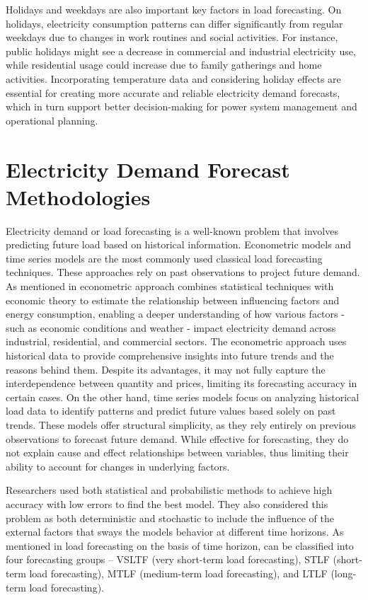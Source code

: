 \documentclass[mstat,12pt]{unswthesis}
\begin{document}
Holidays and weekdays are also important key factors in load
forecasting. On holidays, electricity consumption patterns can differ
significantly from regular weekdays due to changes in work routines and
social activities. For instance, public holidays might see a decrease in
commercial and industrial electricity use, while residential usage could
increase due to family gatherings and home activities. Incorporating
temperature data and considering holiday effects are essential for
creating more accurate and reliable electricity demand forecasts, which
in turn support better decision-making for power system management and
operational planning.

\bigskip

\section{Electricity Demand Forecast
Methodologies}\label{electricity-demand-forecast-methodologies}

Electricity demand or load forecasting is a well-known problem that
involves predicting future load based on historical information.
Econometric models and time series models are the most commonly used
classical load forecasting techniques. These approaches rely on past
observations to project future demand. As mentioned in \cite{9812604}
econometric approach combines statistical techniques with economic
theory to estimate the relationship between influencing factors and
energy consumption, enabling a deeper understanding of how various
factors - such as economic conditions and weather - impact electricity
demand across industrial, residential, and commercial sectors. The
econometric approach uses historical data to provide comprehensive
insights into future trends and the reasons behind them. Despite its
advantages, it may not fully capture the interdependence between
quantity and prices, limiting its forecasting accuracy in certain cases.
On the other hand, time series models focus on analyzing historical load
data to identify patterns and predict future values based solely on past
trends. These models offer structural simplicity, as they rely entirely
on previous observations to forecast future demand. While effective for
forecasting, they do not explain cause and effect relationships between
variables, thus limiting their ability to account for changes in
underlying factors.

\bigskip

Researchers used both statistical and probabilistic methods to achieve
high accuracy with low errors to find the best model. They also
considered this problem as both deterministic and stochastic to include
the influence of the external factors that sways the models behavior at
different time horizons. As mentioned in \cite{9812604} load forecasting
on the basis of time horizon, can be classified into four forecasting
groups -- VSLTF (very short-term load forecasting), STLF (short-term
load forecasting), MTLF (medium-term load forecasting), and LTLF
(long-term load forecasting).
\end{document}
